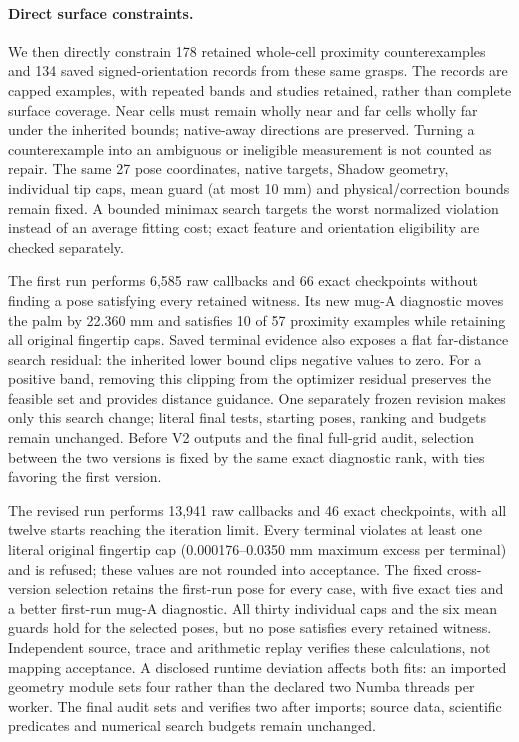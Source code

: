 \documentclass[10pt,letterpaper]{article}
\begin{document}
\paragraph{Direct surface constraints.}

We then directly constrain 178 retained whole-cell proximity counterexamples
and 134 saved signed-orientation records from these same grasps. The records
are capped examples, with repeated bands and studies retained, rather than
complete surface coverage. Near cells must remain wholly near and far cells
wholly far under the inherited bounds; native-away directions are preserved.
Turning a counterexample into an ambiguous or ineligible measurement is not
counted as repair. The same 27 pose coordinates, native targets, Shadow
geometry, individual tip caps, mean guard (at most 10 mm) and physical/correction bounds remain
fixed. A bounded minimax search targets the worst normalized violation instead
of an average fitting cost; exact feature and orientation eligibility are
checked separately.

The first run performs 6,585 raw callbacks and 66 exact checkpoints without
finding a pose satisfying every retained witness. Its new mug-A diagnostic
moves the palm by 22.360 mm and satisfies 10 of 57 proximity examples while
retaining all original fingertip caps. Saved terminal evidence also exposes a
flat far-distance search residual: the inherited lower bound clips negative
values to zero. For a positive band, removing this clipping from the optimizer
residual preserves the feasible set and provides distance guidance. One
separately frozen revision makes only this search change; literal final tests,
starting poses, ranking and budgets remain unchanged. Before V2 outputs and the final full-grid audit, selection between the two versions is fixed
by the same exact diagnostic rank, with ties favoring the first version.

The revised run performs 13,941 raw callbacks and 46 exact checkpoints, with
all twelve starts reaching the iteration limit. Every terminal violates at
least one literal original fingertip cap (0.000176--0.0350 mm maximum excess
per terminal) and is refused; these values are not rounded into acceptance.
The fixed cross-version selection retains the first-run pose for every case,
with five exact ties and a better first-run mug-A diagnostic. All thirty
individual caps and the six mean guards hold for the selected poses, but no
pose satisfies every retained witness. Independent source, trace and
arithmetic replay verifies these calculations, not mapping acceptance.
A disclosed runtime deviation affects both fits: an imported geometry module
sets four rather than the declared two Numba threads per worker. The final
audit sets and verifies two after imports; source data, scientific predicates
and numerical search budgets remain unchanged.
\end{document}
